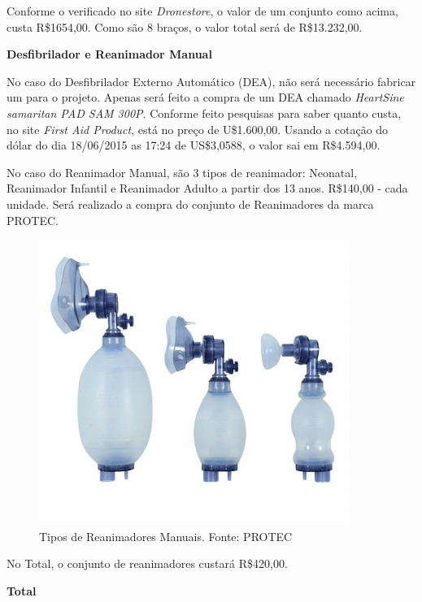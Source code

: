 Conforme o verificado no site \textit{Dronestore}, o valor de um conjunto como acima, custa
R\$1654,00. Como são 8 braços, o valor total será de R\$13.232,00.

\indent \textbf{Desfibrilador e Reanimador Manual}

No caso do Desfibrilador Externo Automático (DEA), não será necessário fabricar um
para o projeto. Apenas será feito a compra de um DEA chamado \textit{HeartSine samaritan PAD
SAM 300P}. Conforme feito pesquisas para saber quanto custa, no site \textit{First Aid Product}\footnotemark, está
no preço de U\$1.600,00. Usando a cotação do dólar do dia 18/06/2015 as 17:24 de
US\$3,0588, o valor sai em R\$4.594,00.

No caso do Reanimador Manual, são 3 tipos de reanimador: Neonatal, Reanimador Infantil e Reanimador Adulto a partir dos 13 anos. R\$140,00 - cada unidade\footnotemark. 
Será realizado a compra do conjunto de Reanimadores da marca PROTEC\footnotemark.

\begin{figure}[H]
    \centering
      \includegraphics[keepaspectratio=true,scale=0.4]{figuras/reanimadores.png}
    \caption{Tipos de Reanimadores Manuais. Fonte: PROTEC}
\end{figure}

No Total, o conjunto de reanimadores custará R\$420,00.

\indent \textbf{Total}

